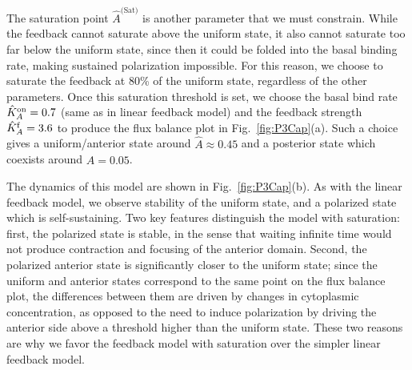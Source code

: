 \documentclass[11pt]{article}
\newcommand{\6}[1]{#1_{\text{6}}}
\newcommand{\3}[1]{#1_{\text{3}}}
\newcommand{\Sat}[1]{#1^\text{(Sat)}}
\begin{document}
The saturation point $\Sat{\hat A}$ is another parameter that we must constrain. While the feedback cannot saturate above the uniform state, it also cannot saturate too far below the uniform state, since then it could be folded into the basal binding rate, making sustained polarization impossible. For this reason, we choose to saturate the feedback at 80\% of the uniform state, regardless of the other parameters. Once this saturation threshold is set, we choose the basal bind rate $\hat{K}^\text{on}_A =0.7$ (same as in linear feedback model) and the feedback strength $\hat{K}^\text{f}_A=3.6$ to produce the flux balance plot in Fig.\ \ref{fig:P3Cap}(a). Such a choice gives a uniform/anterior state around $\hat A \approx 0.45$ and a posterior state which coexists around $\hat A = 0.05$. 

The dynamics of this model are shown in Fig.\ \ref{fig:P3Cap}(b). As with the linear feedback model, we observe stability of the uniform state, and a polarized state which is self-sustaining. Two key features distinguish the model with saturation: first, the polarized state is stable, in the sense that waiting infinite time would not produce contraction and focusing of the anterior domain. Second, the polarized anterior state is significantly closer to the uniform state; since the uniform and anterior states correspond to the same point on the flux balance plot, the differences between them are driven by changes in cytoplasmic concentration, as opposed to the need to induce polarization by driving the anterior side above a threshold higher than the uniform state. These two reasons are why we favor the feedback model with saturation over the simpler linear feedback model. 
\end{document}
